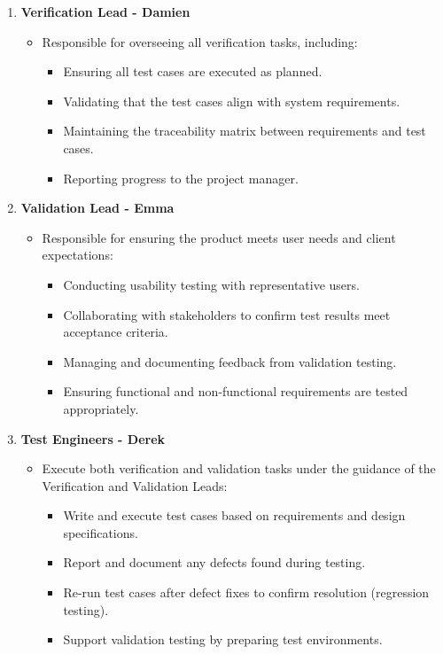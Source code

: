 \documentclass[12pt, titlepage]{article}
\begin{document}
\begin{enumerate}
    \item \textbf{Verification Lead - Damien}
          \begin{itemize}
              \item Responsible for overseeing all verification tasks, including:
                    \begin{itemize}
                        \item Ensuring all test cases are executed as planned.
                        \item Validating that the test cases align with system requirements.
                        \item Maintaining the traceability matrix between requirements and test cases.
                        \item Reporting progress to the project manager.
                    \end{itemize}
          \end{itemize}

    \item \textbf{Validation Lead - Emma}
          \begin{itemize}
              \item Responsible for ensuring the product meets user needs and client expectations:
                    \begin{itemize}
                        \item Conducting usability testing with representative users.
                        \item Collaborating with stakeholders to confirm test results meet acceptance criteria.
                        \item Managing and documenting feedback from validation testing.
                        \item Ensuring functional and non-functional requirements are tested appropriately.
                    \end{itemize}
          \end{itemize}

    \item \textbf{Test Engineers - Derek}
          \begin{itemize}
              \item Execute both verification and validation tasks under the guidance of the Verification and Validation Leads:
                    \begin{itemize}
                        \item Write and execute test cases based on requirements and design specifications.
                        \item Report and document any defects found during testing.
                        \item Re-run test cases after defect fixes to confirm resolution (regression testing).
                        \item Support validation testing by preparing test environments.
                    \end{itemize}
          \end{itemize}


\end{enumerate}
\end{document}

